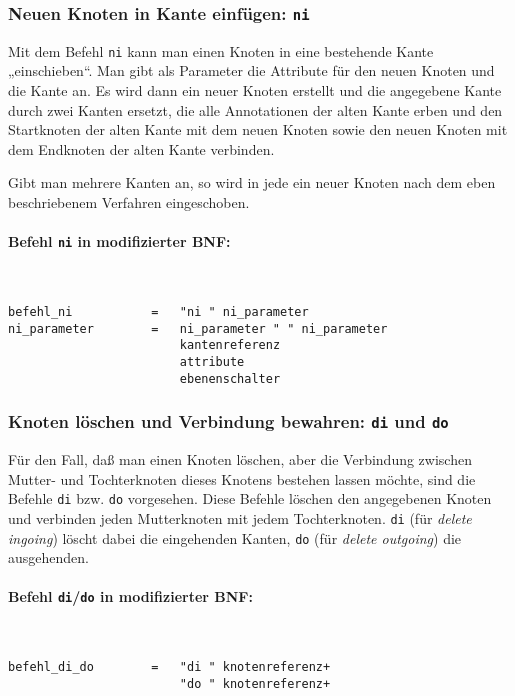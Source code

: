 \documentclass[12pt]{scrartcl}
\begin{document}
\subsubsection{Neuen Knoten in Kante einfügen: \texttt{ni}}

Mit dem Befehl \texttt{ni} kann man einen Knoten in eine bestehende Kante „einschieben“. Man gibt als Parameter die Attribute für den neuen Knoten und die Kante an. Es wird dann ein neuer Knoten erstellt und die angegebene Kante durch zwei Kanten ersetzt, die alle Annotationen der alten Kante erben und den Startknoten der alten Kante mit dem neuen Knoten sowie den neuen Knoten mit dem Endknoten der alten Kante verbinden.

Gibt man mehrere Kanten an, so wird in jede ein neuer Knoten nach dem eben beschriebenem Verfahren eingeschoben.

\paragraph*{Befehl \texttt{ni} in modifizierter BNF:}
~
\begin{framed}
\begin{lstlisting}
befehl_ni           =   "ni " ni_parameter
ni_parameter        =   ni_parameter " " ni_parameter
                        kantenreferenz
                        attribute
                        ebenenschalter
\end{lstlisting}
\end{framed}


\subsubsection{Knoten löschen und Verbindung bewahren: \texttt{di} und \texttt{do}}

Für den Fall, daß man einen Knoten löschen, aber die Verbindung zwischen Mutter- und Tochterknoten dieses Knotens bestehen lassen möchte, sind die Befehle \texttt{di} bzw. \texttt{do} vorgesehen. Diese Befehle löschen den angegebenen Knoten und verbinden jeden Mutterknoten mit jedem Tochterknoten. \texttt{di} (für \textit{delete ingoing}) löscht dabei die eingehenden Kanten, \texttt{do} (für \textit{delete outgoing}) die ausgehenden.

\paragraph*{Befehl \texttt{di}/\texttt{do} in modifizierter BNF:}
~
\begin{framed}
\begin{lstlisting}
befehl_di_do        =   "di " knotenreferenz+
                        "do " knotenreferenz+
\end{lstlisting}
\end{framed}
\end{document}
